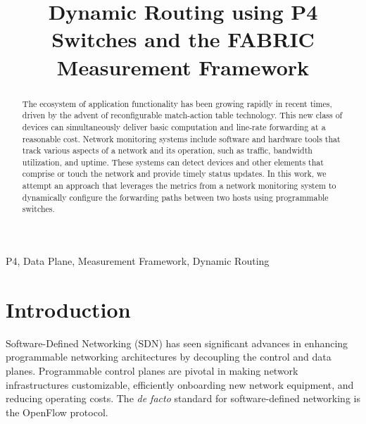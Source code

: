 \documentclass[conference]{IEEEtran}
\begin{document}
	\title{Dynamic Routing using P4 Switches and the FABRIC Measurement Framework\\}

	\author{
	\and
	}
\maketitle

	\begin{abstract}
	The ecosystem of application functionality has been growing rapidly in recent times, driven by the advent of reconfigurable match-action table technology. This new class of devices can simultaneously deliver basic computation and line-rate forwarding at a reasonable cost. Network monitoring systems include software and hardware tools that track various aspects of a network and its operation, such as traffic, bandwidth utilization, and uptime. These systems can detect devices and other elements that comprise or touch the network and provide timely status updates. In this work, we attempt an approach that leverages the metrics from a network monitoring system to dynamically configure the forwarding paths between two hosts using programmable switches.
	\end{abstract}
    \begin{IEEEkeywords} P4, Data Plane, Measurement Framework, Dynamic Routing \end{IEEEkeywords}

    \section{Introduction}
    Software-Defined Networking (SDN) has seen significant advances in enhancing programmable networking architectures by decoupling the control and data planes. Programmable control planes are pivotal in making network infrastructures customizable, efficiently onboarding new network equipment, and reducing operating costs. The \textit{de facto} standard for software-defined networking is the OpenFlow protocol. 
    
\end{document}
